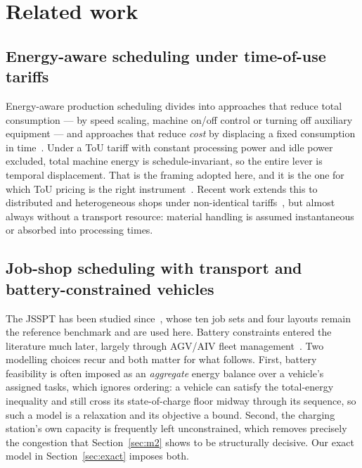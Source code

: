 \documentclass[preprint, 3p, review, 12pt]{elsarticle}
\theoremstyle{definition}
\begin{document}
\section{Related work}
\label{sec:rwork}

\subsection{Energy-aware scheduling under time-of-use tariffs}
Energy-aware production scheduling divides into approaches that reduce total consumption ---
by speed scaling, machine on/off control or turning off auxiliary equipment --- and
approaches that reduce \emph{cost} by displacing a fixed consumption in
time~\citep{7349258, MANSOURI2016772, ZHANG2017665}. Under a ToU tariff with constant
processing power and idle power excluded, total machine energy is schedule-invariant, so the
entire lever is temporal displacement. That is the framing adopted here, and it is the one
for which ToU pricing is the right instrument~\citep{su14106264, app12031491}. Recent work
extends this to distributed and heterogeneous shops under non-identical
tariffs~\citep{WANG2024777, LENG2025528, ZHAO2025420}, but almost always without a transport
resource: material handling is assumed instantaneous or absorbed into processing times.

\subsection{Job-shop scheduling with transport and battery-constrained vehicles}
The JSSPT has been studied since~\citet{bilge1995}, whose ten job sets and four layouts
remain the reference benchmark and are used here. Battery constraints entered the literature
much later, largely through AGV/AIV fleet management~\citep{DESTOUET2023155, DESTOUET2024110419,
QIN2023242}. Two modelling choices recur and both matter for what follows. First, battery
feasibility is often imposed as an \emph{aggregate} energy balance over a vehicle's assigned
tasks, which ignores ordering: a vehicle can satisfy the total-energy inequality and still
cross its state-of-charge floor midway through its sequence, so such a model is a relaxation
and its objective a bound. Second, the charging station's own capacity is frequently left
unconstrained, which removes precisely the congestion that Section~\ref{sec:m2} shows to be
structurally decisive. Our exact model in Section~\ref{sec:exact} imposes both.
\end{document}
